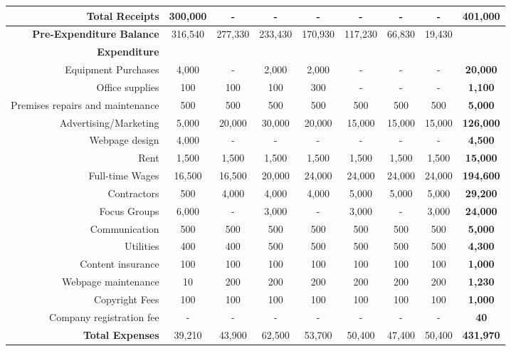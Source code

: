 \documentclass[12pt, a4paper]{article}
\newcounter{TableFootnoteStart}
\newenvironment{autothreeparttable}{\begin{threeparttable}\setcounter{TableFootnoteStart}{\thefootnote}}{\end{threeparttable}}
\newenvironment{main}
{\begin{spacing}{1.2}\setlength{\parskip}{0.5\baselineskip}}
{\end{spacing}\setlength{\parskip}{0pt}}
\begin{document}
\begin{main}
\begin{appendices}
\begin{table}
\begin{center}
{\begin{autothreeparttable}
\begin{tabular}{rcccccccc}
						\textbf{Total Receipts}  & 300,000 & - & - & - & - & - & - & \textbf{401,000} \\ \midrule
						\textbf{Pre-Expenditure Balance}  & 316,540 & 277,330 & 233,430 & 170,930 & 117,230 & 66,830 & 19,430 & \\ \midrule
						\textbf{Expenditure} & & & & & & & & \\
						\rowcolor{lgrey} Equipment Purchases  & 4,000 & - & 2,000 & 2,000 & - & - & - & \textbf{20,000} \\
						Office supplies  & 100 & 100 & 100 & 300 & - & - & - & \textbf{1,100} \\
						\rowcolor{lgrey} Premises repairs and maintenance  & 500 & 500 & 500 & 500 & 500 & 500 & 500 & \textbf{5,000}\\
						Advertising/Marketing  & 5,000 & 20,000 & 30,000 & 20,000 & 15,000 & 15,000 & 15,000 & \textbf{126,000} \\
						\rowcolor{lgrey} Webpage design  & 4,000 & - & - & - & - & - & - & \textbf{4,500} \\
						Rent  & 1,500 & 1,500 & 1,500 & 1,500 & 1,500 & 1,500 & 1,500 & \textbf{15,000} \\
						\rowcolor{lgrey} Full-time Wages  & 16,500 & 16,500 & 20,000 & 24,000 & 24,000 & 24,000 & 24,000 & \textbf{194,600} \\
						Contractors  & 500 & 4,000 & 4,000 & 4,000 & 5,000 & 5,000 & 5,000 & \textbf{29,200} \\
						\rowcolor{lgrey} Focus Groups  & 6,000 & - & 3,000 & - & 3,000 & - & 3,000 & \textbf{24,000} \\
						Communication  & 500 & 500 & 500 & 500 & 500 & 500 & 500 & \textbf{5,000} \\
						\rowcolor{lgrey} Utilities & 400 & 400 & 500 & 500 & 500 & 500 & 500 & \textbf{4,300} \\
						Content insurance  & 100 & 100 & 100 & 100 & 100 & 100 & 100 & \textbf{1,000} \\
						\rowcolor{lgrey} Webpage maintenance  & 10 & 200 & 200 & 200 & 200 & 200 & 200 & \textbf{1,230} \\
						Copyright Fees  & 100 & 100 & 100 & 100 & 100 & 100 & 100 & \textbf{1,000} \\
						\rowcolor{lgrey} Company registration fee  & - & - & - & - & - & - & - & \textbf{40} \\
						\textbf{Total Expenses}  & 39,210 & 43,900 & 62,500 & 53,700 & 50,400 & 47,400 & 50,400 & \textbf{431,970} \\ \midrule

\end{tabular}
\end{autothreeparttable}}
\end{center}
\end{table}
\end{appendices}
\end{main}
\end{document}
